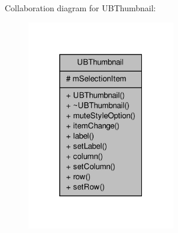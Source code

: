 Collaboration diagram for U\-B\-Thumbnail\-:
\nopagebreak
\begin{figure}[H]
\begin{center}
\leavevmode
\includegraphics[width=184pt]{d4/d2c/class_u_b_thumbnail__coll__graph}
\end{center}
\end{figure}
